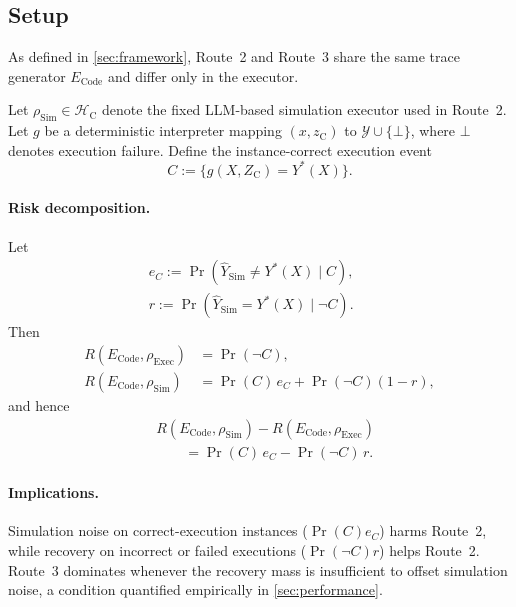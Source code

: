 \subsection{Setup}
\label{sec:route2v3_setup}
As defined in \cref{sec:framework}, Route~2 and Route~3 share the same
trace generator $E_{\mathrm{Code}}$ and differ only in the executor.

Let $\rho_{\mathrm{Sim}}\in\mathcal{H}_{\mathrm{C}}$ denote the fixed
LLM-based simulation executor used in Route~2.
Let $g$ be a deterministic interpreter mapping $(x,z_{\mathrm{C}})$ to
$\mathcal{Y}\cup\{\bot\}$, where $\bot$ denotes execution failure. Define the instance-correct execution event
\[
C := \{ g(X,Z_{\mathrm{C}}) = Y^*(X) \}.
\]

\paragraph{Risk decomposition.}
Let
\begin{align*}
& e_C := \Pr(\hat Y_{\mathrm{Sim}}\neq Y^*(X)\mid C),
\qquad \\
& r := \Pr(\hat Y_{\mathrm{Sim}}=Y^*(X)\mid \neg C).
\end{align*}
Then
\begin{align*}
R(E_{\mathrm{Code}},\rho_{\mathrm{Exec}}) &= \Pr(\neg C),\\
R(E_{\mathrm{Code}},\rho_{\mathrm{Sim}}) &= \Pr(C)\,e_C + \Pr(\neg C)(1-r),
\end{align*}
and hence
\begin{align*}
&R(E_{\mathrm{Code}},\rho_{\mathrm{Sim}})
 -R(E_{\mathrm{Code}},\rho_{\mathrm{Exec}})\\
&\qquad =
\Pr(C)\,e_C
-
\Pr(\neg C)\,r .
\end{align*}

\paragraph{Implications.}
Simulation noise on correct-execution instances ($\Pr(C)e_C$) harms
Route~2, while recovery on incorrect or failed executions
($\Pr(\neg C)r$) helps Route~2.
Route~3 dominates whenever the recovery mass is insufficient to offset
simulation noise, a condition quantified empirically in
\cref{sec:performance}.

